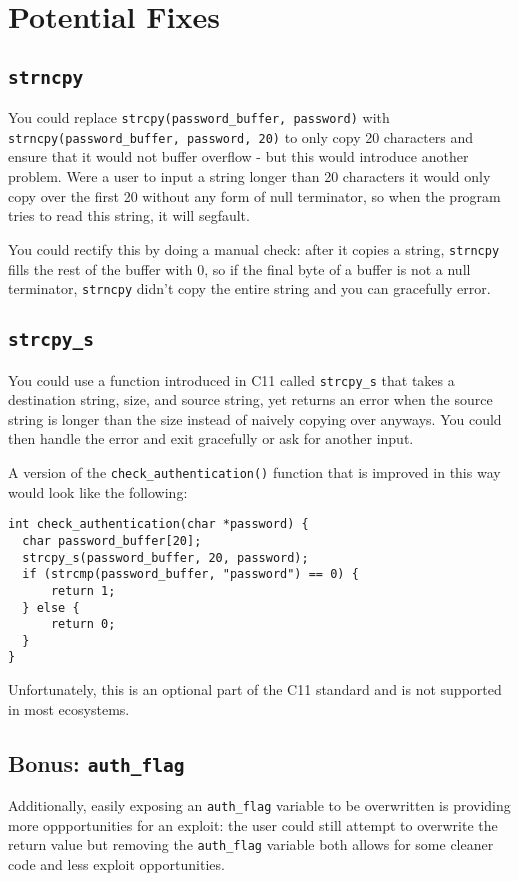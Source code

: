 \documentclass[11pt]{article}
\begin{document}
\section*{Potential Fixes}
\label{sec:org0f83e4c}
\subsection*{\texttt{strncpy}}
\label{sec:org74b56c2}
You could replace \texttt{strcpy(password\_buffer, password)} with \texttt{strncpy(password\_buffer, password, 20)} to only copy 20 characters and ensure that it would not buffer overflow - but this would introduce another problem. Were a user to input a string longer than 20 characters it would only copy over the first 20 without any form of null terminator, so when the program tries to read this string, it will segfault.

You could rectify this by doing a manual check: after it copies a string, \texttt{strncpy} fills the rest of the buffer with 0, so if the final byte of a buffer is not a null terminator, \texttt{strncpy} didn't copy the entire string and you can gracefully error.

\subsection*{\texttt{strcpy\_s}}
\label{sec:orgc6bdf59}
You could use a function introduced in C11 called \texttt{strcpy\_s} that takes a destination string, size, and source string, yet returns an error when the source string is longer than the size instead of naively copying over anyways. You could then handle the error and exit gracefully or ask for another input.

A version of the \texttt{check\_authentication()} function that is improved in this way would look like the following: 
\begin{verbatim}
int check_authentication(char *password) {
  char password_buffer[20];  
  strcpy_s(password_buffer, 20, password);
  if (strcmp(password_buffer, "password") == 0) {
      return 1;
  } else {
      return 0;
  }  
}
\end{verbatim}

Unfortunately, this is an optional part of the C11 standard and is not supported in most ecosystems.

\subsection*{Bonus: \texttt{auth\_flag}}
\label{sec:orgd8901e6}
Additionally, easily exposing an \texttt{auth\_flag} variable to be overwritten is providing more oppportunities for an exploit: the user could still attempt to overwrite the return value but removing the \texttt{auth\_flag} variable both allows for some cleaner code and less exploit opportunities.
\end{document}
